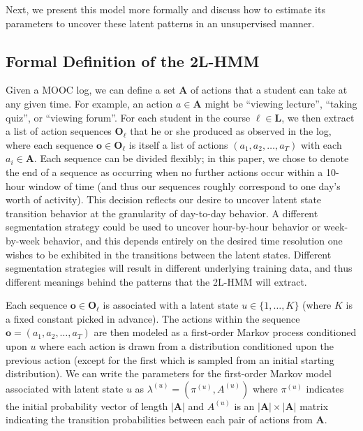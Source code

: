 Next, we present this model more formally and discuss how to
estimate its parameters to uncover these latent patterns in an unsupervised
manner.

\subsection{Formal Definition of the 2L-HMM}

Given a MOOC log, we can define a set $\mathbf{A}$ of actions that a
student can take at any given time. For example, an action $a \in
\mathbf{A}$ might be ``viewing lecture'', ``taking quiz'', or ``viewing
forum''. For each student in the course $\ell \in \mathbf{L}$, we then
extract a list of action sequences $\mathbf{O}_\ell$ that he or she
produced as observed in the log, where each sequence $\mathbf{o} \in
\mathbf{O}_\ell$ is itself a list of actions $(a_1, a_2, \ldots, a_T)$ with
each $a_i \in \mathbf{A}$.  Each sequence can be divided flexibly; in this
paper, we chose to denote the end of a sequence as occurring when no further
actions occur within a 10-hour window of time (and thus our sequences
roughly correspond to one day's worth of activity). This decision reflects
our desire to uncover latent state transition behavior at the granularity
of day-to-day behavior. A different segmentation strategy could be used to
uncover hour-by-hour behavior or week-by-week behavior, and this depends
entirely on the desired time resolution one wishes to be exhibited in the
transitions between the latent states. Different segmentation strategies
will result in different underlying training data, and thus different
meanings behind the patterns that the 2L-HMM will extract.

Each sequence $\mathbf{o} \in \mathbf{O}_\ell$ is associated with a latent
state $u \in \{1,\ldots,K\}$ (where $K$ is a fixed constant picked in
advance). The actions within the sequence $\mathbf{o} = (a_1, a_2, \ldots,
a_T)$ are then modeled as a first-order Markov process conditioned upon $u$
where each action is drawn from a distribution conditioned upon the
previous action (except for the first which is sampled from an initial
starting distribution). We can write the parameters for the first-order
Markov model associated with latent state $u$ as $\lambda^{(u)} =
(\pi^{(u)}, A^{(u)})$ where $\pi^{(u)}$ indicates the initial probability
vector of length $|\mathbf{A}|$ and $A^{(u)}$ is an $|\mathbf{A}| \times
|\mathbf{A}|$ matrix indicating the transition probabilities between each
pair of actions from $\mathbf{A}$.

